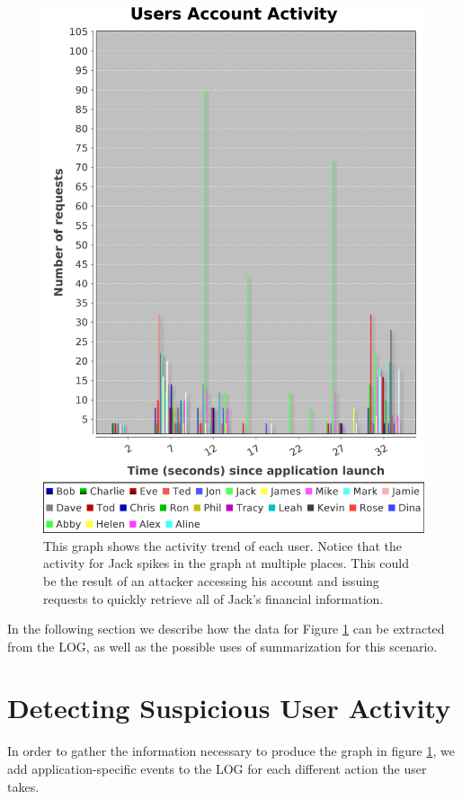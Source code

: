 \begin{figure}
\centering
\includegraphics[width=\textwidth,height=\textheight,keepaspectratio]{figures/activity}
\caption[Mint User Activity Trend]{This graph shows the activity trend of each user. Notice that the activity for Jack spikes in the graph at multiple places. This could be the result of an attacker accessing his account and issuing requests to quickly retrieve all of Jack's financial information.}
\label{fig:user-activity}
\end{figure}
In the following section we describe how the data for Figure \ref{fig:user-activity} can be extracted from the LOG, as well as the possible uses of summarization for this scenario.

\section{Detecting Suspicious User Activity}
\label{audit:mint-example}
In order to gather the information necessary to produce the graph in figure \ref{fig:user-activity}, we add application-specific events to the LOG for each different action the user takes.

